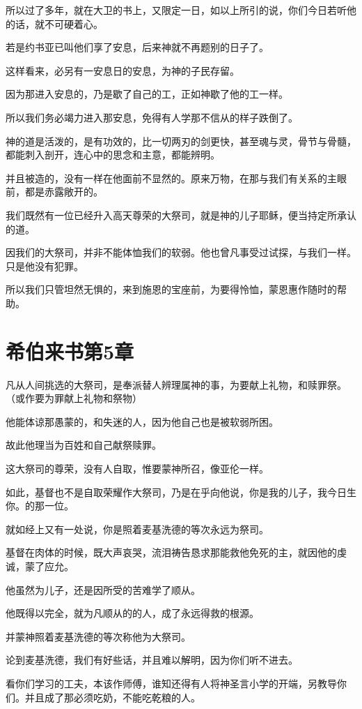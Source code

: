 \documentclass[12pt,oneside]{book}
\begin{document}
所以过了多年，就在大卫的书上，又限定一日，如以上所引的说，你们今日若听他的话，就不可硬着心。

若是约书亚已叫他们享了安息，后来神就不再题别的日子了。

这样看来，必另有一安息日的安息，为神的子民存留。

因为那进入安息的，乃是歇了自己的工，正如神歇了他的工一样。

所以我们务必竭力进入那安息，免得有人学那不信从的样子跌倒了。

神的道是活泼的，是有功效的，比一切两刃的剑更快，甚至魂与灵，骨节与骨髓，都能刺入剖开，连心中的思念和主意，都能辨明。

并且被造的，没有一样在他面前不显然的。原来万物，在那与我们有关系的主眼前，都是赤露敞开的。

我们既然有一位已经升入高天尊荣的大祭司，就是神的儿子耶稣，便当持定所承认的道。

因我们的大祭司，并非不能体恤我们的软弱。他也曾凡事受过试探，与我们一样。只是他没有犯罪。

所以我们只管坦然无惧的，来到施恩的宝座前，为要得怜恤，蒙恩惠作随时的帮助。

\chapter{希伯来书第5章}
凡从人间挑选的大祭司，是奉派替人辨理属神的事，为要献上礼物，和赎罪祭。（或作要为罪献上礼物和祭物）

他能体谅那愚蒙的，和失迷的人，因为他自己也是被软弱所困。

故此他理当为百姓和自己献祭赎罪。

这大祭司的尊荣，没有人自取，惟要蒙神所召，像亚伦一样。

如此，基督也不是自取荣耀作大祭司，乃是在乎向他说，你是我的儿子，我今日生你。的那一位。

就如经上又有一处说，你是照着麦基洗德的等次永远为祭司。

基督在肉体的时候，既大声哀哭，流泪祷告恳求那能救他免死的主，就因他的虔诚，蒙了应允。

他虽然为儿子，还是因所受的苦难学了顺从。

他既得以完全，就为凡顺从的的人，成了永远得救的根源。

并蒙神照着麦基洗德的等次称他为大祭司。

论到麦基洗德，我们有好些话，并且难以解明，因为你们听不进去。

看你们学习的工夫，本该作师傅，谁知还得有人将神圣言小学的开端，另教导你们。并且成了那必须吃奶，不能吃乾粮的人。
\end{document}
